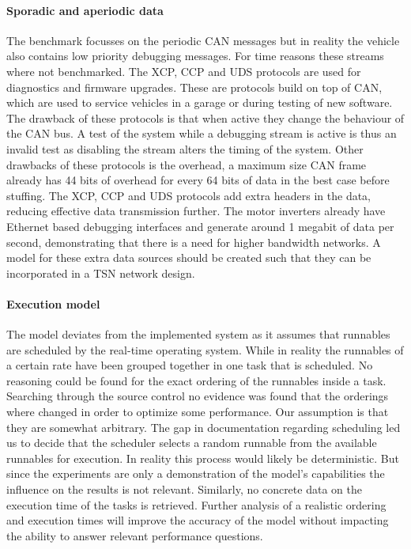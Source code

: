 \paragraph{Sporadic and aperiodic data}
The benchmark focusses on the periodic CAN messages but in reality the vehicle also contains low priority debugging messages. For time reasons these streams where not benchmarked. The XCP, CCP and UDS protocols are used for diagnostics and firmware upgrades. These are protocols build on top of CAN, which are used to service vehicles in a garage or during testing of new software. The drawback of these protocols is that when active they change the behaviour of the CAN bus. A test of the system while a debugging stream is active is thus an invalid test as disabling the stream alters the timing of the system. Other drawbacks of these protocols is the overhead, a maximum size CAN frame already has 44 bits of overhead for every 64 bits of data in the best case before stuffing. The XCP, CCP and UDS protocols add extra headers in the data, reducing effective data transmission further. The motor inverters already have Ethernet based debugging interfaces and generate around 1 megabit of data per second, demonstrating that there is a need for higher bandwidth networks. A model for these extra data sources should be created such that they can be incorporated in a TSN network design.

\paragraph{Execution model}
The model deviates from the implemented system as it assumes that runnables are scheduled by the real-time operating system. While in reality the runnables of a certain rate have been grouped together in one task that is scheduled. No reasoning could be found for the exact ordering of the runnables inside a task. Searching through the source control no evidence was found that the orderings where changed in order to optimize some performance. Our assumption is that they are somewhat arbitrary. The gap in documentation regarding scheduling led us to decide that the scheduler selects a random runnable from the available runnables for execution. In reality this process would likely be deterministic. But since the experiments are only a demonstration of the model's capabilities the influence on the results is not relevant. Similarly, no concrete data on the execution time of the tasks is retrieved. Further analysis of a realistic ordering and execution times will improve the accuracy of the model without impacting the ability to answer relevant performance questions.

